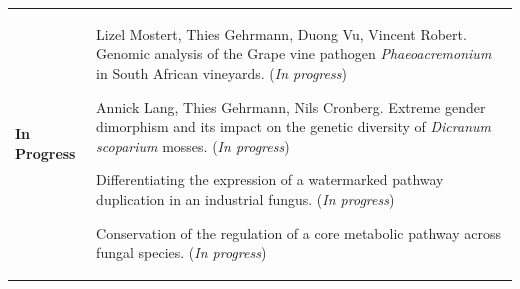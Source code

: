 \documentclass[letterpaper, 10pt]{article} %
\newcommand{\entryni}[2]{
  \noindent
  \begin{tabular}[t]{p{0.2\textwidth}|p{0.8\textwidth}}
    \textbf{\color{BrickRed}#1} & {#2} \\
  \end{tabular}
  \vspace{-2mm}

}
\begin{document}
\entryni{In Progress}
{
	\begin{enumerate}[label={[\arabic*]},nosep]
		\addtocounter{enumi}{10}
		\item {Lizel Mostert, Thies Gehrmann, Duong Vu, Vincent Robert. Genomic analysis of the Grape vine pathogen \textit{Phaeoacremonium} in South African vineyards.  (\textit{In progress}) } \newline
		\item {Annick Lang, Thies Gehrmann, Nils Cronberg. Extreme gender dimorphism and its impact on the genetic diversity of \textit{Dicranum scoparium} mosses. (\textit{In progress}) } \newline
		\item {Differentiating the expression of a watermarked pathway duplication in an industrial fungus. (\textit{In progress}) } \newline
		\item {Conservation of the regulation of a core metabolic pathway across fungal species. (\textit{In progress}) }
		\vspace*{-\baselineskip}
	\end{enumerate}
}

\end{document}
